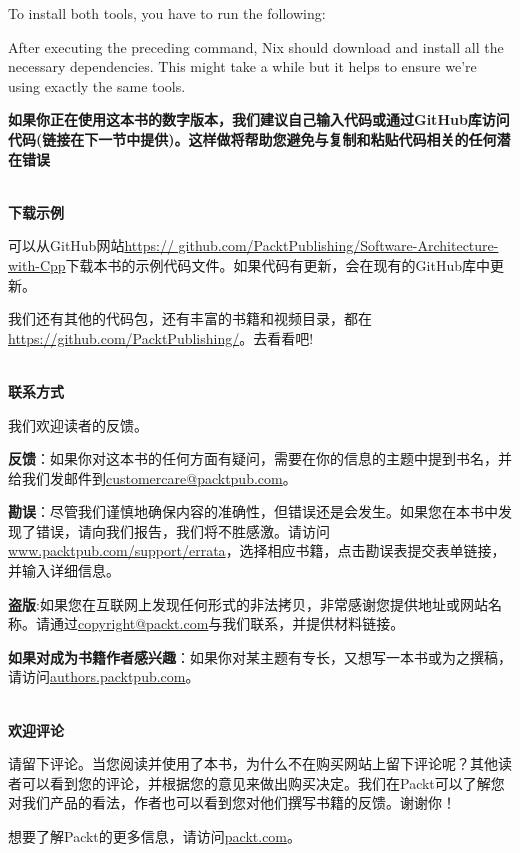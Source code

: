 To install both tools, you have to run the following:



After executing the preceding command, Nix should download and install all the necessary dependencies. This might take a while but it helps to ensure we're using exactly the same tools.

\textbf{如果你正在使用这本书的数字版本，我们建议自己输入代码或通过GitHub库访问代码(链接在下一节中提供)。这样做将帮助您避免与复制和粘贴代码相关的任何潜在错误}

\hspace*{\fill} \\ %
\textbf{下载示例}

可以从GitHub网站\url{https://	github.com/PacktPublishing/Software-Architecture-with-Cpp}下载本书的示例代码文件。如果代码有更新，会在现有的GitHub库中更新。

我们还有其他的代码包，还有丰富的书籍和视频目录，都在\url{https://github.com/PacktPublishing/}。去看看吧!

\hspace*{\fill} \\ %
\textbf{联系方式}

我们欢迎读者的反馈。

\textbf{反馈}：如果你对这本书的任何方面有疑问，需要在你的信息的主题中提到书名，并给我们发邮件到\url{customercare@packtpub.com}。

\textbf{勘误}：尽管我们谨慎地确保内容的准确性，但错误还是会发生。如果您在本书中发现了错误，请向我们报告，我们将不胜感激。请访问\url{www.packtpub.com/support/errata}，选择相应书籍，点击勘误表提交表单链接，并输入详细信息。

\textbf{盗版}:如果您在互联网上发现任何形式的非法拷贝，非常感谢您提供地址或网站名称。请通过\url{copyright@packt.com}与我们联系，并提供材料链接。

\textbf{如果对成为书籍作者感兴趣}：如果你对某主题有专长，又想写一本书或为之撰稿，请访问\url{authors.packtpub.com}。

\hspace*{\fill} \\ %
\textbf{欢迎评论}

请留下评论。当您阅读并使用了本书，为什么不在购买网站上留下评论呢？其他读者可以看到您的评论，并根据您的意见来做出购买决定。我们在Packt可以了解您对我们产品的看法，作者也可以看到您对他们撰写书籍的反馈。谢谢你！

想要了解Packt的更多信息，请访问\url{packt.com}。










